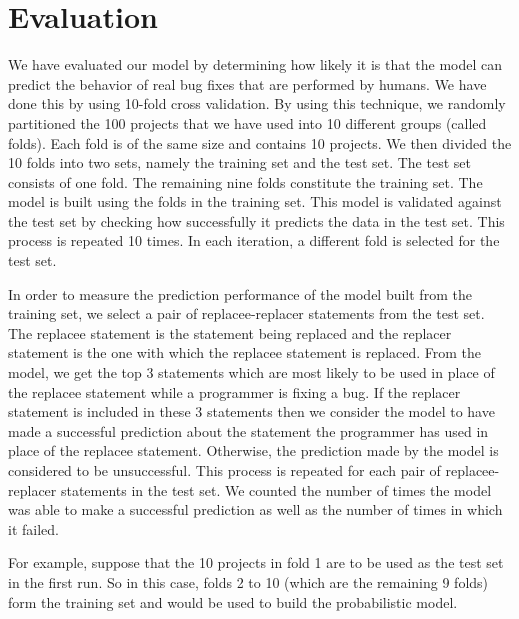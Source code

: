 
\section{Evaluation}\label{sec:stmtstudy}
We have evaluated our model by determining how likely it is that the model can predict the behavior of real bug fixes that are performed by humans.
We have done this by using 10-fold cross validation. By using this technique, we randomly partitioned the 100 projects that we have used into 10 different groups (called folds). Each fold is of the same size and contains 10 projects. We then divided the 10 folds into two sets, namely the training set and the test set. The test set consists of one fold. The remaining nine folds constitute the training set. The model is built using the folds in the training set. This model is validated against the test set by checking how successfully it predicts the data in the test set. This process is repeated 10 times. In each iteration, a different fold is selected for the test set.

In order to measure the prediction performance of the model built from the training set, we select a pair of replacee-replacer statements from the test set. The replacee statement is the statement being replaced and the replacer statement is the one with which the replacee statement is replaced. From the model, we get the top 3 statements which are most likely to be used in place of the replacee statement while a programmer is fixing a bug. If the replacer statement is included in these 3 statements then we consider the model to have made a successful prediction about the statement the programmer has used in place of the replacee statement. Otherwise, the prediction made by the model is considered to be unsuccessful. This process is repeated for each pair of replacee-replacer statements in the test set. We counted the number of times the model was able to make a successful prediction as well as the number of times in which it failed.

For example, suppose that the 10 projects in fold 1 are to be used as the test set in the first run.
So in this case, folds 2 to 10 (which are the remaining 9 folds) form the training set and would be used to build the probabilistic model.

